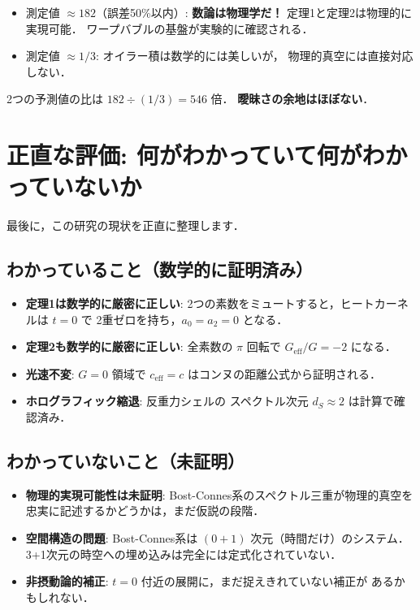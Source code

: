 \documentclass[11pt,a4paper]{article}
\begin{document}
\begin{tcolorbox}[colback=green!5,colframe=green!50!black,title=判定基準]
\begin{itemize}
  \item 測定値 $\approx 182$（誤差50\%以内）:
    \textbf{数論は物理学だ！}
    定理1と定理2は物理的に実現可能．
    ワープバブルの基盤が実験的に確認される．
  \item 測定値 $\approx 1/3$:
    オイラー積は数学的には美しいが，
    物理的真空には直接対応しない．
\end{itemize}
2つの予測値の比は $182 \div (1/3) = 546$ 倍．
\textbf{曖昧さの余地はほぼない}．
\end{tcolorbox}

\section{正直な評価: 何がわかっていて何がわかっていないか}

最後に，この研究の現状を正直に整理します．

\subsection{わかっていること（数学的に証明済み）}

\begin{itemize}
  \item \textbf{定理1は数学的に厳密に正しい}:
    2つの素数をミュートすると，ヒートカーネルは $t=0$ で
    2重ゼロを持ち，$a_0 = a_2 = 0$ となる．
  \item \textbf{定理2も数学的に厳密に正しい}:
    全素数の $\pi$ 回転で $G_{\text{eff}}/G = -2$ になる．
  \item \textbf{光速不変}: $G=0$ 領域で $c_{\text{eff}} = c$
    はコンヌの距離公式から証明される．
  \item \textbf{ホログラフィック縮退}: 反重力シェルの
    スペクトル次元 $d_S \approx 2$ は計算で確認済み．
\end{itemize}

\subsection{わかっていないこと（未証明）}

\begin{itemize}
  \item \textbf{物理的実現可能性は未証明}:
    Bost-Connes系のスペクトル三重が物理的真空を
    忠実に記述するかどうかは，まだ仮説の段階．
  \item \textbf{空間構造の問題}:
    Bost-Connes系は $(0+1)$ 次元（時間だけ）のシステム．
    3+1次元の時空への埋め込みは完全には定式化されていない．
  \item \textbf{非摂動論的補正}:
    $t = 0$ 付近の展開に，まだ捉えきれていない補正が
    あるかもしれない．
\end{itemize}
\end{document}
